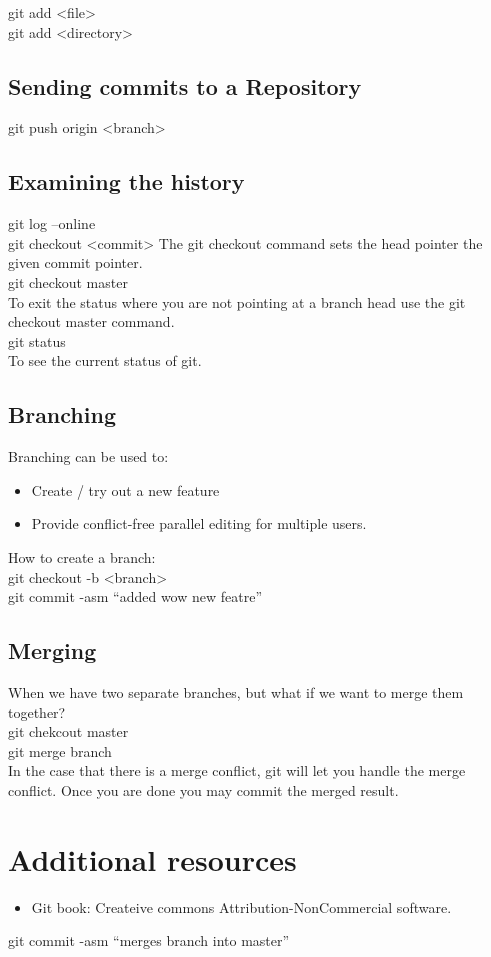\documentclass[a4paper,10pt]{scrartcl}
\begin{document}
\indent git add <file>\\
\indent git add <directory>

\subsection{Sending commits to a Repository}%
\label{sub:sending_commits_to_a_repository}
\indent git push origin <branch>

\subsection{Examining the history}%
\label{sub:examining_the_history}
\indent git log --online\\
\indent git checkout <commit>
The git checkout command sets the head pointer the given commit pointer.\\
\indent git checkout master\\
To exit the status where you are not pointing at a branch head use the git
checkout master command.\\
\indent git status\\
To see the current status of git.

\subsection{Branching}%
\label{sub:branching}
Branching can be used to:
\begin{itemize}
    \item Create / try out a new feature
    \item Provide conflict-free parallel editing for multiple users.
\end{itemize}

How to create a branch:\\
\indent git checkout -b <branch>\\
\indent git commit -asm ``added wow new featre''

\subsection{Merging}%
\label{sub:merging}

When we have two separate branches, but what if we want to merge them
together?\\
\indent git chekcout master\\
\indent git merge branch\\
In the case that there is a merge conflict, git will let you handle the merge
conflict. Once you are done you may commit the merged result.

\section{Additional resources}%
\label{sec:additional_resources}

\begin{itemize}
    \item Git book: Createive commons Attribution-NonCommercial software.
\end{itemize}



\indent git commit -asm ``merges branch into master''
\end{document}
